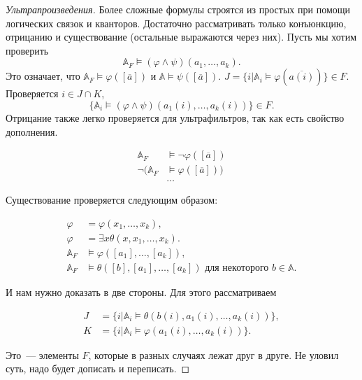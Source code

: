 \begin{proof}[Ультрапроизведения]
    Более сложные формулы строятся из простых при помощи логических связок и кванторов. Достаточно рассматривать только конъюнкцию, отрицанию и существование (остальные выражаются через них). Пусть мы хотим проверить $$\mathbb{A}_F \models (\varphi \wedge \psi)(a_1, \ldots, a_k).$$ Это означает, что $\mathbb{A}_F \models \varphi([\overline{a}])$ и $\mathbb{A} \models \psi ([\overline{a}])$. $J = \{i | \mathbb{A}_i \models \varphi(\overline{a(i)})\} \in F$. Проверяется $i \in J \cap K$, $$\{\mathbb{A}_i \models (\varphi \wedge \psi)(a_1(i), \ldots, a_k(i))\} \in F.$$ Отрицание также легко проверяется для ультрафильтров, так как есть свойство дополнения. 

    \begin{equation*}
        \begin{aligned}
            \mathbb{A}_F &\models \neg \varphi([\overline{a}]) \\ 
            \neg (\mathbb{A}_F &\models \varphi([\overline{a}])) \\ 
            & \ldots
        \end{aligned}
    \end{equation*} 

    Существование проверяется следующим образом: 

    \begin{equation*}
        \begin{aligned}
            \varphi &= \varphi(x_1, \ldots, x_k), \\ 
            \varphi &= \exists x \theta (x, x_1, \ldots, x_k). \\ 
            \mathbb{A}_F &\models \varphi([a_1], \ldots, [a_k]), \\ 
            \mathbb{A}_F &\models \theta([b], [a_1], \ldots, [a_k]) \text{ для некоторого } b \in \mathbb{A}.  
        \end{aligned}
    \end{equation*} 

    И нам нужно доказать в две стороны. Для этого рассматриваем  

    \begin{equation*}
        \begin{aligned}
            J &= \{i | \mathbb{A}_i \models \theta(b(i), a_1(i), \ldots, a_k(i))\}, \\ 
            K &= \{i | \mathbb{A}_i \models \varphi(a_1(i), \ldots, a_k(i))\}.
        \end{aligned}
    \end{equation*} 

    Это~— элементы $F$, которые в разных случаях лежат друг в друге. Не уловил суть, надо будет дописать и переписать.
\end{proof} 

